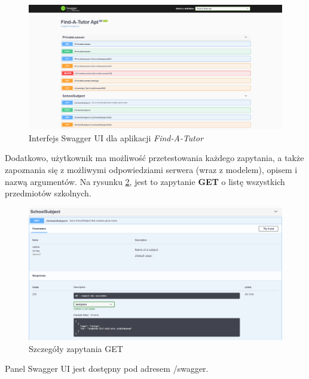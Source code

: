 \documentclass[12pt]{article}
\numberwithin{figure}{section}
\begin{document}
\begin{sloppypar}
\begin{figure}[H] 
    \centering
    \includegraphics[width=1\textwidth]{images/chapter_3/swagger.png}
    \caption{Interfejs Swagger UI dla aplikacji \textit{Find-A-Tutor}}
    \label{fig:swagger}
\end{figure}
    
Dodatkowo, użytkownik ma możliwość przetestowania każdego zapytania, a także zapoznania się z możliwymi odpowiedziami serwera (wraz z modelem), opisem i nazwą argumentów. Na rysunku \ref{fig:swagger-get}, jest to zapytanie \textbf{GET} o listę wszystkich przedmiotów szkolnych. 
    
\begin{figure}[H] 
    \centering
    \includegraphics[width=1\textwidth]{images/chapter_3/swagger-get.png}
    \caption{Szczegóły zapytania GET}
    \label{fig:swagger-get}
\end{figure}
    
Panel Swagger UI jest dostępny pod adresem /swagger.


\end{sloppypar}
\end{document}
